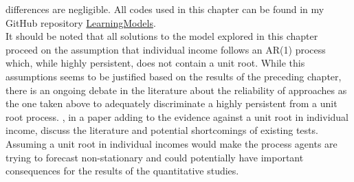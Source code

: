 differences are negligible. All codes used in this chapter can be found in my 
GitHub repository \href{https://github.com/nilshg/LearningModels}{LearningModels}. \\
It should be noted that all solutions to the model explored in this chapter 
proceed on the assumption that individual income follows an AR(1) process which,
while highly persistent, does not contain a unit root. While this assumptions
seems to be justified based on the results of the preceding chapter, there is 
an ongoing debate in the literature about the reliability of approaches as the 
one taken above to adequately discriminate a highly persistent from a unit root 
process. \citet{GustavssonOsterholm2010}, in a paper adding to the evidence against
a unit root in individual income, discuss the literature and potential shortcomings
of existing tests. Assuming a unit root in individual incomes would make the 
process agents are trying to forecast non-stationary and could potentially have
important consequences for the results of the quantitative studies. 


